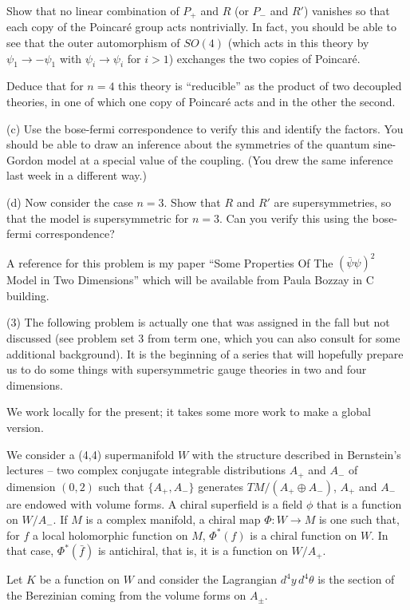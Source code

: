 Show that no linear combination of $P_+$ and $R$ (or $P_-$ and $R'$)
vanishes so that each copy of the Poincar\'e group acts nontrivially.
In fact, you should be able to see that the outer automorphism of
$SO(4)$ (which acts in this theory by $\psi_1\to -\psi_1$ with
$\psi_i\to\psi_i$ for $i>1$) exchanges the two copies of Poincar\'e.

Deduce that for $n=4$ this theory is ``reducible'' as the product
of two decoupled theories, in one of which one copy of Poincar\'e acts
and in the other the second.


(c) Use the  bose-fermi correspondence to verify this and identify
the factors.  You should be able to draw an inference about the
symmetries of the quantum sine-Gordon model at a special value
of the coupling.  (You drew the same inference last week in a different
way.)

(d) Now consider the case $n=3$. Show that $R$ and $R'$ are
supersymmetries, so that the model is supersymmetric for $n=3$.
Can you verify this using the bose-fermi correspondence?

A reference for this problem is my paper ``Some Properties Of
The $(\bar\psi\psi)^2$ Model in Two Dimensions'' which will be available
from Paula Bozzay in C building.

(3) The following problem is actually one that was assigned in the fall but
not discussed (see problem set 3 from term one, which
you can also consult for some additional background).  
It is the beginning of a series that will hopefully
prepare us to do some things with supersymmetric  gauge theories
in two and four dimensions.

We work locally for the present; it takes some more work to make
a global version.

\def\R{{\bf R}}\def\Z{{\bf Z}}



We consider a (4,4) supermanifold $W$ with
the structure described in Bernstein's lectures -- two complex
conjugate integrable distributions $A_+$ and $A_-$ of dimension $(0,2)$
such that $\{A_+,A_-\}$ generates $TM/(A_+\oplus A_-)$,  $A_+$ and $A_-$
are endowed with volume forms.
A chiral superfield is a field $\phi$ that is a function on
$W/A_-$.  If $M$ is a complex manifold, a chiral map $\Phi:W\to M$ is
one such that, for $f$ a local holomorphic function on $M$, 
$\Phi^*(f)$ is a chiral function on $W$.  In that case, $\Phi^*(\bar f)$ is
antichiral, that is, it is a function on $W/A_+$.

Let $K$ be a function on $W$ and consider the Lagrangian
\eqn{}
$d^4y\,d^4\theta$ is the section of the Berezinian coming from the
volume forms on $A_\pm$.  

